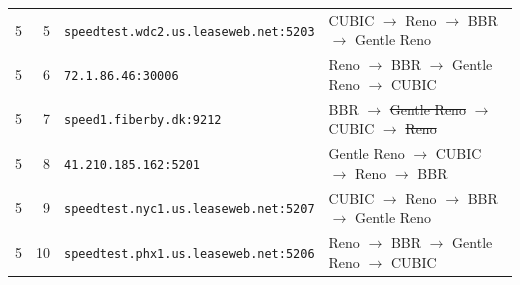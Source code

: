 \begin{longtable}{rrll}
5 & 5 & \texttt{speedtest.\allowbreak{}wdc2.\allowbreak{}us.\allowbreak{}leaseweb.\allowbreak{}net:5203} & CUBIC $\to$ Reno $\to$ BBR $\to$ Gentle Reno \\
5 & 6 & \texttt{72.\allowbreak{}1.\allowbreak{}86.\allowbreak{}46:30006} & Reno $\to$ BBR $\to$ Gentle Reno $\to$ CUBIC \\
5 & 7 & \texttt{speed1.\allowbreak{}fiberby.\allowbreak{}dk:9212} & BBR $\to$ \sout{Gentle Reno} $\to$ CUBIC $\to$ \sout{Reno} \\
5 & 8 & \texttt{41.\allowbreak{}210.\allowbreak{}185.\allowbreak{}162:5201} & Gentle Reno $\to$ CUBIC $\to$ Reno $\to$ BBR \\
5 & 9 & \texttt{speedtest.\allowbreak{}nyc1.\allowbreak{}us.\allowbreak{}leaseweb.\allowbreak{}net:5207} & CUBIC $\to$ Reno $\to$ BBR $\to$ Gentle Reno \\
5 & 10 & \texttt{speedtest.\allowbreak{}phx1.\allowbreak{}us.\allowbreak{}leaseweb.\allowbreak{}net:5206} & Reno $\to$ BBR $\to$ Gentle Reno $\to$ CUBIC \\
\bottomrule
\end{longtable}

